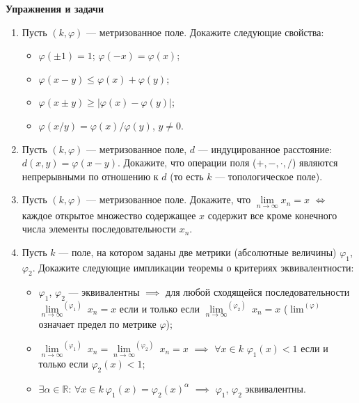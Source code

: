 \noindent\textbf{Упражнения и задачи}
\begin{enumerate}[topsep=0pt]

    \item Пусть $(k,\varphi)$ --- метризованное поле. Докажите следующие свойства:
    \begin{itemize}[topsep=0pt]
        \item $\varphi(\pm 1)=1$; $\varphi (-x) = \varphi (x)$;
        \item $\varphi (x - y) \leqslant \varphi(x) + \varphi(y)$;
        \item $\varphi(x \pm y) \geqslant |\varphi(x) - \varphi(y)|$;
        \item $\varphi(x/y) = \varphi(x)/\varphi(y)$, $y \neq 0$.
    \end{itemize}

    \item Пусть $(k,\varphi)$ --- метризованное поле, $d$ --- индуцированное расстояние: $d(x,y) = \varphi(x-y)$. Докажите, что операции поля ($+,-,\cdot,/$) являются непрерывными по отношению к $d$ (то есть $k$ --- топологическое поле).

    \item Пусть $(k,\varphi)$ --- метризованное поле. Докажите, что $\lim\limits_{n\rightarrow\infty} x_n = x$ $\Leftrightarrow$ каждое открытое множество содержащее $x$ содержит все кроме конечного числа элементы последовательности $x_n$.
    
    \item Пусть $k$ --- поле, на котором заданы две метрики (абсолютные величины) $\varphi_1$, $\varphi_2$. Докажите следующие импликации теоремы о критериях эквивалентности:
    \begin{itemize}[topsep=0pt]
        \item $\varphi_1$, $\varphi_2$ --- эквивалентны $\implies$ для любой сходящейся последовательности\\ ${\lim\limits_{n\rightarrow\infty}}^{(\varphi_1)}\ x_n = x$ если и только если ${\lim\limits_{n\rightarrow\infty}}^{(\varphi_2)}\ x_n = x$ (${\lim\limits}^{(\varphi)}$ означает предел по метрике $\varphi$);
        \item ${\lim\limits_{n\rightarrow\infty}}^{(\varphi_1)}\ x_n = {\lim\limits_{n\rightarrow\infty}}^{(\varphi_2)}\ x_n = x$  $\implies$ $\forall x \in k$ $\varphi_1(x)<1$ если и только если $\varphi_2(x)<1$;
        \item $\exists \alpha \in \mathbb{R}$: $\forall x \in k\ \varphi_1(x)=\varphi_2(x)^\alpha$ $\implies$ $\varphi_1$, $\varphi_2$ эквивалентны.
    \end{itemize}


\end{enumerate}
